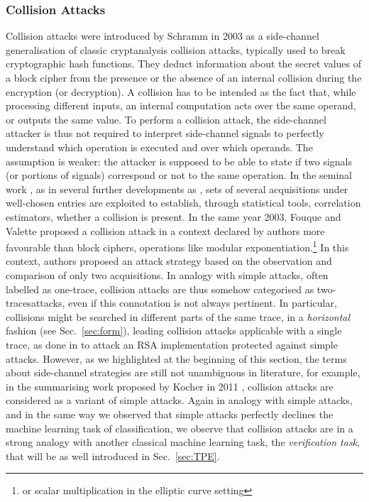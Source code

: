\subsubsection{Collision Attacks}
Collision attacks were introduced by Schramm \etal in 2003 \cite{schramm2003new} as a side-channel generalisation of classic cryptanalysis collision attacks, typically used to break cryptographic hash functions. They deduct information about the secret values of a block cipher from the presence or the absence of an internal collision during the encryption (or decryption). A collision has to be intended as the fact that, while processing different inputs, an internal computation acts over the same operand, or outputs the same value. To perform a collision attack, the side-channel attacker is thus not required to interpret side-channel signals to perfectly understand which operation is executed and over which operands. The assumption is weaker: the attacker is supposed to be able to state if two signals (or portions of signals) correspond or not to the same operation. In the seminal work \cite{schramm2003new}, as in several further developments as \cite{ledig2004enhancing,schramm2004collision,bogdanov2007improved,bogdanov2008multiple}, sets of several acquisitions under well-chosen entries are exploited to establish, through statistical tools, \eg correlation estimators, whether a collision is present. In the same year 2003, Fouque and Valette \cite{fouque2003doubling} proposed a collision attack in a context declared by authors more favourable than block ciphers, \ie operations like modular exponentiation.\footnote{or scalar multiplication in the elliptic curve setting} In this context, authors proposed an attack strategy based on the observation and comparison of only two acquisitions. In analogy with simple attacks, often labelled as \textquotedbl one-trace\textquotedbl , collision attacks are thus somehow categorised as \textquotedbl two-traces\textquotedbl attacks, even if this connotation is not always pertinent. In particular, collisions might be searched in different parts of the same trace, \ie in a \emph{horizontal} fashion (see Sec.~\ref{sec:form}), leading collision attacks applicable with a single trace, \eg as done in \cite{clavier2010horizontal} to attack an RSA implementation protected against simple attacks. However, as we highlighted at the beginning of this section, the terms about side-channel strategies are still not unambiguous in literature, for example, in the summarising work proposed by Kocher \etal in 2011 \cite{kocher2011introduction}, collision attacks are considered as a variant of simple attacks. Again in analogy with simple attacks, and in the same way we observed that simple attacks perfectly declines the machine learning task of classification, we observe that collision attacks are in a strong analogy with another classical machine learning task, \ie the \emph{verification task}, that will be as well introduced in Sec.~\ref{sec:TPE}.

